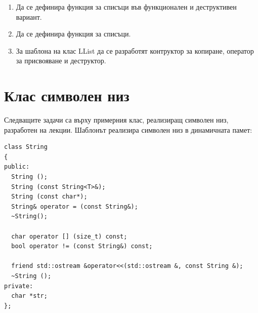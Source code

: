 \begin{enumerate}
  \item Да се дефинира функция  за списъци във функционален и деструктивен вариант.

  \item Да се дефинира функция  за списъци.

  \item За шаблона на клас  LList да се разработят контруктор за копиране, оператор за присвояване и деструктор. 


\end{enumerate}

\pagebreak

\clearpage\section{Клас символен низ}\label{sect:String}

\begin{mdframed}[hidealllines=true,backgroundcolor=gray!20]
Следващите задачи са върху примерния клас, реализиращ символен низ, разработен на лекции. Шаблонът реализира символен низ в динамичната памет:
\begin{verbatim}
class String
{
public:
  String ();
  String (const String<T>&);
  String (const char*);
  String& operator = (const String&);
  ~String();

  char operator [] (size_t) const;
  bool operator != (const String&) const;

  friend std::ostream &operator<<(std::ostream &, const String &);
  ~String ();
private:
  char *str;
};

\end{verbatim}
\end{mdframed}

